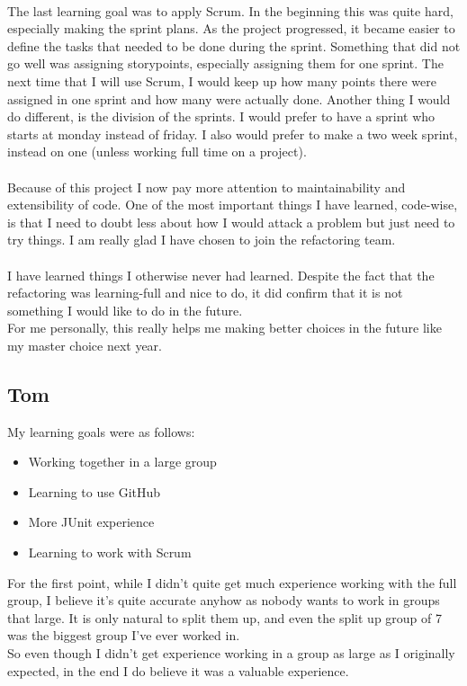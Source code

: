 \documentclass{article}
\begin{document}
\begin{enumerate}
\begin{itemize}
\\
The last learning goal was to apply Scrum. In the beginning this was quite hard, especially making the sprint plans. As the project progressed, it became easier to define the tasks that needed to be done during the sprint. Something that did not go well was assigning storypoints, especially assigning them for one sprint. The next time that I will use Scrum, I would keep up how many points there were assigned in one sprint and how many were actually done. Another thing I would do different, is the division of the sprints. I would prefer to have a sprint who starts at monday instead of friday. I also would prefer to make a two week sprint, instead on one (unless working full time on a project). \\
\\
Because of this project I now pay more attention to maintainability and extensibility of code. 
One of the most important things I have learned, code-wise, is that I need to doubt less about how I would attack a problem but just need to try things. I am really glad I have chosen to join the refactoring team. \\
\\
I have learned things I otherwise never had learned. Despite the fact that the refactoring was learning-full and nice to do, it did confirm that it is not something I would like to do in the future. \\
For me personally, this really helps me making better choices in the future like my master choice next year.


\subsection*{Tom}
My learning goals were as follows:
\begin{itemize}
\item Working together in a large group
\item Learning to use GitHub
\item More JUnit experience
\item Learning to work with Scrum \\
\end{itemize}

For the first point, while I didn't quite get much experience working with the full group, I believe it's quite accurate anyhow as nobody wants to work in groups that large. It is only natural to split them up, and even the split up group of 7 was the biggest group I've ever worked in. \\
So even though I didn't get experience working in a group as large as I originally expected, in the end I do believe it was a valuable experience. \\


\end{itemize}
\end{enumerate}
\end{document}
